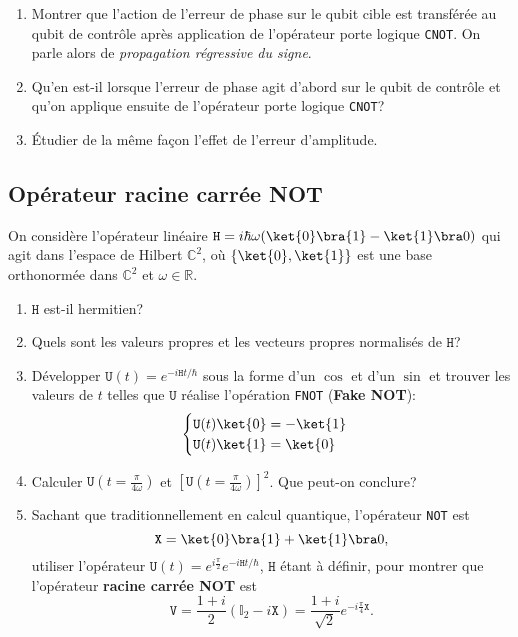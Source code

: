 \begin{enumerate}
\item Montrer que l'action de l'erreur de phase sur le qubit cible est
transférée au qubit de contrôle après application de l'opérateur porte logique
\texttt{CNOT}. On parle alors de \emph{propagation régressive du signe}.

\item Qu'en est-il lorsque l'erreur de phase agit d'abord sur le qubit de
contrôle et qu'on applique ensuite de l'opérateur porte logique \texttt{CNOT}?

\item Étudier de la même façon l'effet de l'erreur d'amplitude.
\end{enumerate}

\subsection{Opérateur racine carrée NOT}

On considère l'opérateur linéaire $\mathtt{H}=i\hbar\omega(\ket{0}\bra{1}
-\ket{1} \bra0)$ qui agit dans l'espace de Hilbert $\mathbb{C}^2$, où
$\{\ket{0},\ket{1}\}$ est une base orthonormée dans $\mathbb{C}^2$ et
$\omega\in\mathbb{R}$.

\begin{enumerate}
\item $\mathtt{H}$ est-il hermitien?

\item Quels sont les valeurs propres et les vecteurs propres normalisés de
$\mathtt{H}$?

\item Développer $\mathtt{U}(t)=e^{-i\mathtt{H}t/\hbar}$ sous la forme d'un
$\cos$ et d'un $\sin$ et trouver les valeurs de $t$ telles que $\mathtt{U}$
réalise l'opération \texttt{FNOT} (\textbf{Fake NOT}):%
\begin{equation}
\begin{cases}
\mathtt{U}(t)\ket{0} =-\ket{1} \\
\mathtt{U}(t)\ket{1} =\ket{0}
\end{cases}
\end{equation}

\item Calculer $\mathtt{U}(t=\frac{\pi}{4\omega})$ et 
$[\mathtt{U}(t=\frac{\pi}{4\omega})]^2$. Que peut-on conclure?

\item Sachant que traditionnellement en calcul quantique, l'opérateur
\texttt{NOT} est
\begin{equation}
	\mathtt{X}=\ket{0}\bra{1}+\ket{1}\bra0,
\end{equation}
utiliser l'opérateur $\mathtt{U}(t)=e^{i\frac{\pi}{2}}e^{-i\mathtt{H}t/\hbar}$,
$\mathtt{H}$ étant à définir, pour montrer que l'opérateur \textbf{racine carrée
NOT} est
\begin{equation}
	\mathtt{V}=\frac{1+i}{2}(\mathbb{I}_2-i\mathtt{X})=\frac{1+i}{\sqrt{2}}
	e^{-i\frac{\pi}{4}\mathtt{X}}.
\end{equation}
\end{enumerate}

